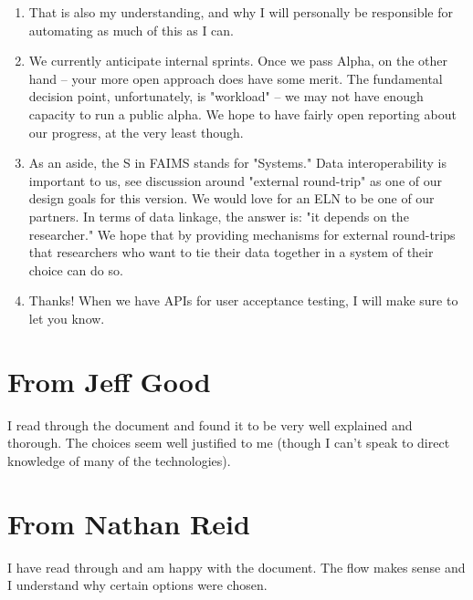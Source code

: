 \documentclass[a4paper,headings=small fontsize=10pt]{scrreprt}
\begin{document}
\begin{enumerate}
\begin{enumerate}
  \end{enumerate}
\item That is also my understanding, and why I will personally be
  responsible for automating as much of this as I can.
 
\item We currently anticipate internal sprints. Once we pass Alpha, on the
  other hand -- your more open approach does have some merit. The
  fundamental decision point, unfortunately, is "workload" -- we may
  not have enough capacity to run a public alpha. We hope to have fairly
  open reporting about our progress, at the very least though.
 
\item As an aside, the S in FAIMS stands for "Systems." Data
  interoperability is important to us, see discussion around "external
  round-trip" as one of our design goals for this version. We would love
  for an ELN to be one of our partners. In terms of data linkage, the
  answer is: "it depends on the researcher." We hope that by providing
  mechanisms for external round-trips that researchers who want to tie
  their data together in a system of their choice can do so.
 
\item Thanks! When we have APIs for user acceptance testing, I will make
  sure to let you know.
 
\end{enumerate}

\section{From Jeff Good}

I read through the document and found it to be very well explained and
thorough. The choices seem well justified to me (though I can't speak to
direct knowledge of many of the technologies).

\section{From Nathan Reid}

I have read through and am happy with the document. The flow makes sense
and I understand why certain options were chosen.
\end{document}
